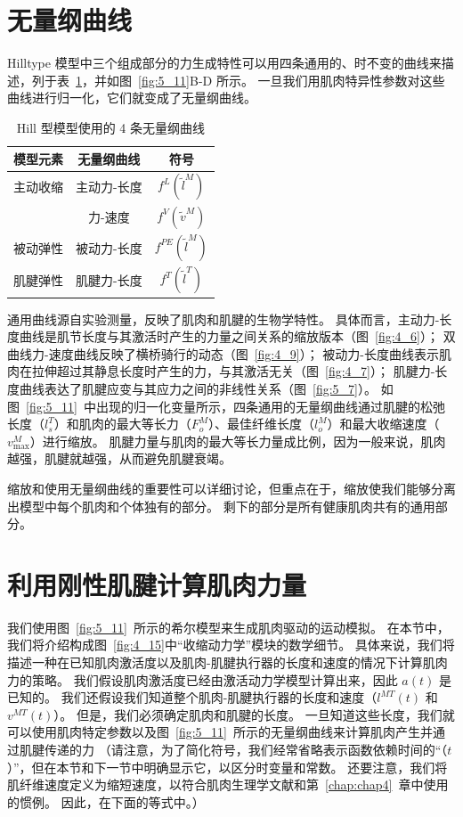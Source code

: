 \section{无量纲曲线}

Hilltype 模型中三个组成部分的力生成特性可以用四条通用的、时不变的曲线来描述，列于表~\ref{tab:5_3}，并如图~\ref{fig:5_11}B-D 所示。
一旦我们用肌肉特异性参数对这些曲线进行归一化，它们就变成了无量纲曲线。

\begin{table}[htbp]
	\caption{Hill 型模型使用的 4 条无量纲曲线} \label{tab:5_3} \centering
	\begin{tabular}{ccc} %
		\toprule
		\textbf{模型元素} & \textbf{无量纲曲线} & \textbf{符号}  \\
		\midrule
		主动收缩 & 主动力-长度 &  $f^L(\tilde{l} ^M)$ \\
		\midrule
		 & 力-速度 &  $f^V(\tilde{v} ^M)$ \\
		\midrule
		被动弹性 & 被动力-长度 &  $f^{PE}(\tilde{l} ^M)$ \\
		\midrule
		肌腱弹性 & 肌腱力-长度 &  $f^{T}(\tilde{l} ^T)$ \\
		\bottomrule
	\end{tabular}
\end{table}


通用曲线源自实验测量，反映了肌肉和肌腱的生物学特性。
具体而言，主动力-长度曲线是肌节长度与其激活时产生的力量之间关系的缩放版本（图~\ref{fig:4_6}）；
双曲线力-速度曲线反映了横桥骑行的动态（图~\ref{fig:4_9}）；
被动力-长度曲线表示肌肉在拉伸超过其静息长度时产生的力，与其激活无关（图~\ref{fig:4_7}）；
肌腱力-长度曲线表达了肌腱应变与其应力之间的非线性关系（图~\ref{fig:5_7}）。
如图~\ref{fig:5_11}~中出现的归一化变量所示，四条通用的无量纲曲线通过肌腱的松弛长度（$l_s^T$）和肌肉的最大等长力（$F_o^M$）、最佳纤维长度（$l_o^M$）和最大收缩速度（$v_\text{max} ^M$）进行缩放。
肌腱力量与肌肉的最大等长力量成比例，因为一般来说，肌肉越强，肌腱就越强，从而避免肌腱衰竭。


缩放和使用无量纲曲线的重要性可以详细讨论，但重点在于，缩放使我们能够分离出模型中每个肌肉和个体独有的部分。
剩下的部分是所有健康肌肉共有的通用部分。



\section{利用刚性肌腱计算肌肉力量}

我们使用图~\ref{fig:5_11}~所示的希尔模型来生成肌肉驱动的运动模拟。
在本节中，我们将介绍构成图~\ref{fig:4_15}中“收缩动力学”模块的数学细节。
具体来说，我们将描述一种在已知肌肉激活度以及肌肉-肌腱执行器的长度和速度的情况下计算肌肉力的策略。
我们假设肌肉激活度已经由激活动力学模型计算出来，因此 $a(t)$ 是已知的。
我们还假设我们知道整个肌肉-肌腱执行器的长度和速度（$l^{MT}(t)$ 和 $v^{MT}(t)$）。
但是，我们必须确定肌肉和肌腱的长度。
一旦知道这些长度，我们就可以使用肌肉特定参数以及图~\ref{fig:5_11}~所示的无量纲曲线来计算肌肉产生并通过肌腱传递的力
（请注意，为了简化符号，我们经常省略表示函数依赖时间的“（$t$）”，但在本节和下一节中明确显示它，以区分时变量和常数。
还要注意，我们将肌纤维速度定义为缩短速度，以符合肌肉生理学文献和第~\ref{chap:chap4}~章中使用的惯例。
因此，在下面的等式中。）


